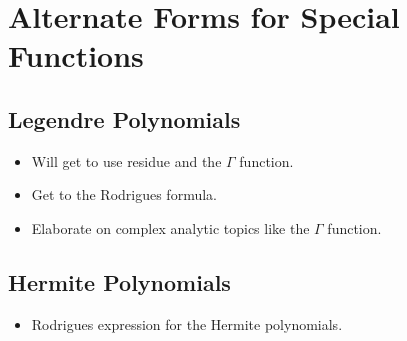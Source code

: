 \documentclass[../finalProject.tex]{subfiles}
\begin{document}
\section{Alternate Forms for Special Functions}
\setcounter{subsection}{2}
\subsection{Legendre Polynomials}
\begin{itemize}
    \item {}Will get to use residue and the $\Gamma$ function.
    \item Get to the Rodrigues formula.
    \item Elaborate on complex analytic topics like the $\Gamma$ function.
\end{itemize}


\subsection{Hermite Polynomials}
\begin{itemize}
    \item Rodrigues expression for the Hermite polynomials.
\end{itemize}
\end{document}
